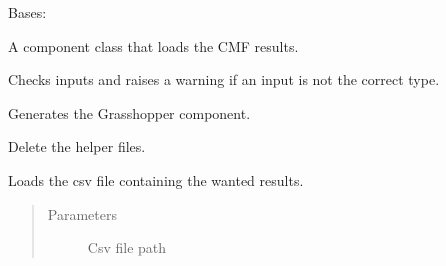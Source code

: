 \documentclass[letterpaper,10pt,english]{sphinxmanual}
\begin{document}
\begin{fulllineitems}
\label{\detokenize{cmf:livestock.components.comp_cmf.CMFResults}}
Bases: {\hyperref[\detokenize{superclass:livestock.components.component.GHComponent}]{}}

A component class that loads the CMF results.

\begin{fulllineitems}
\label{\detokenize{cmf:livestock.components.comp_cmf.CMFResults.check_inputs}}
Checks inputs and raises a warning if an input is not the correct type.

\end{fulllineitems}


\begin{fulllineitems}
\label{\detokenize{cmf:livestock.components.comp_cmf.CMFResults.config}}
Generates the Grasshopper component.

\end{fulllineitems}


\begin{fulllineitems}
\label{\detokenize{cmf:livestock.components.comp_cmf.CMFResults.delete_files}}
Delete the helper files.

\end{fulllineitems}


\begin{fulllineitems}
\label{\detokenize{cmf:livestock.components.comp_cmf.CMFResults.load_result_csv}}
Loads the csv file containing the wanted results.
\begin{quote}\begin{description}
\item[{Parameters}] \leavevmode
{} \textendash{} Csv file path


\end{description}
\end{quote}
\end{fulllineitems}
\end{fulllineitems}
\end{document}
